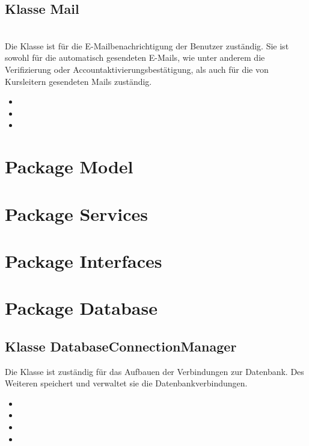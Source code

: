 	\subsection{Klasse Mail}
	\\
	Die Klasse ist für die E-Mailbenachrichtigung der Benutzer zuständig. Sie ist sowohl für die automatisch gesendeten E-Mails, wie unter anderem die Verifizierung oder Accountaktivierungsbestätigung, als auch für die von Kursleitern gesendeten Mails zuständig.
	\begin{itemize}
		\item {}
		\item {}
		\item {}
	\end{itemize}
	
	
	\section{Package Model}
	
	\section{Package Services}
	
	\section{Package Interfaces}
	
	\section{Package Database}
	
	\subsection{Klasse DatabaseConnectionManager}
	Die Klasse ist zuständig für das Aufbauen der Verbindungen zur Datenbank. Des Weiteren
	speichert und verwaltet sie die Datenbankverbindungen. 
	\begin{itemize}
		\item {}
		\item {}
		\item {}
		\item {}
	\end{itemize}
	

